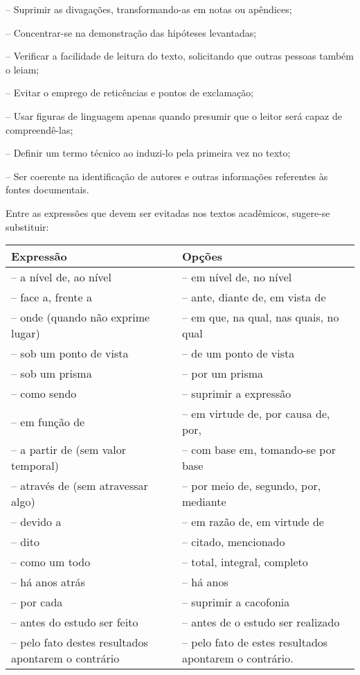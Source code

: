 – Suprimir as divagações, transformando-as em notas ou apêndices;

– Concentrar-se na demonstração das hipóteses levantadas;

– Verificar a facilidade de leitura do texto, solicitando que outras pessoas também o leiam;

– Evitar o emprego de reticências e pontos de exclamação;

– Usar figuras de linguagem apenas quando presumir que o leitor será capaz de compreendê-las;

– Definir um termo técnico ao induzi-lo pela primeira vez no texto;

– Ser coerente na identificação de autores e outras informações referentes às fontes documentais.

Entre as expressões que devem ser evitadas nos textos acadêmicos, sugere-se substituir:

\begin{tabular}{|L{7cm}|L{7cm}|}\hline
Expressão  &	Opções\\\hline
– a nível de, ao nível	& – em nível de, no nível\\\hline
– face a, frente a	&– ante, diante de, em vista de\\\hline
– onde (quando não exprime lugar)	& – em que, na qual, nas quais, no qual\\\hline
– sob um ponto de vista	& – de um ponto de vista\\\hline
– sob um prisma	& – por um prisma\\\hline
– como sendo	& – suprimir a expressão\\\hline
– em função de	& – em virtude de, por causa de, por,\\\hline
– a partir de (sem valor temporal)	& – com base em, tomando-se por base\\\hline
– através de (sem atravessar algo)	& – por meio de, segundo, por, mediante\\\hline
– devido a	& – em razão de, em virtude de\\\hline
– dito	& – citado, mencionado\\\hline
– como um todo	& – total, integral, completo\\\hline
– há anos atrás	& – há anos\\\hline
– por cada	& – suprimir a cacofonia\\\hline
– antes do estudo ser feito	& – antes de o estudo ser realizado\\\hline
– pelo fato destes resultados apontarem o contrário	& – pelo fato de estes resultados apontarem o contrário.\\\hline
\end{tabular}
